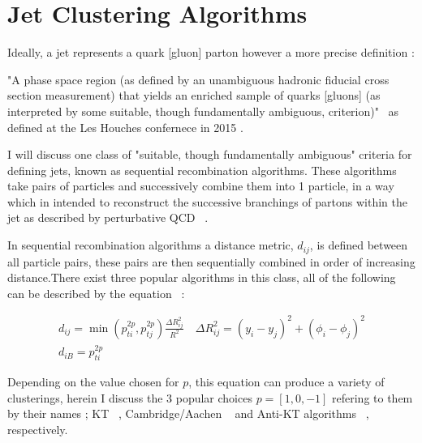 


\section{Jet Clustering Algorithms}\label{secSM:ch1}

Ideally, a jet represents a quark [gluon] parton however a more precise definition :

"A phase space region (as defined by an unambiguous
hadronic fiducial cross section measurement) that yields
an enriched sample of quarks [gluons] (as interpreted by some
suitable, though fundamentally ambiguous, criterion)"~\cite{Badger:2016bpw} as defined at the Les Houches confernece in 2015 .

I will discuss one class of "suitable, though fundamentally ambiguous" criteria for defining jets, known as sequential recombination algorithms. These algorithms take pairs of particles and successively combine them into 1 particle, in a way which in intended to reconstruct the successive branchings of partons within the jet as described by perturbative QCD ~\cite{Marzani:2019hun}.
 
In sequential recombination algorithms a distance metric, $d_{ij}$, is defined between all particle pairs, these pairs are then sequentially combined in order of increasing distance.There exist three popular  algorithms in this class, all of the following can be described by the equation ~\cite{Ellis:1993tq}:


\begin{equation}
\begin{array}{l}{d_{i j}=\min \left(p_{t i}^{2 p}, p_{t j}^{2 p}\right) \frac{\Delta R_{i j}^{2}}{R^{2}} \quad \Delta R_{i j}^{2}=\left(y_{i}-y_{j}\right)^{2}+\left(\phi_{i}-\phi_{j}\right)^{2}} \\ {d_{i B}=p_{t i}^{2 p}}\end{array}
\end{equation}


Depending on the value chosen for $p$, this equation can produce a variety of clusterings, herein I discuss the 3 popular choices $p = [1, 0, -1]$ refering to them by their names ; KT ~\cite{Ellis:1993tq}, Cambridge/Aachen ~\cite{Dokshitzer:1997in} and Anti-KT algorithms ~\cite{Cacciari:2008gp}, respectively.









